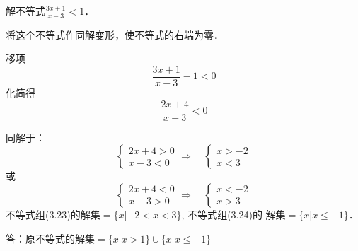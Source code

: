 \begin{example}
    解不等式$\frac{3x+1}{x-3}<1$．
\end{example}

\begin{solution}
    将这个不等式作同解变形，使不等式的右端为零．

    移项$$\frac{3x+1}{x-3}-1<0$$
化简得$$\frac{2x+4}{x-3}<0$$

同解于：
\begin{equation}
    \begin{cases}
        2x+4>0\\x-3<0
    \end{cases}\Rightarrow\quad \begin{cases}
        x>-2\\  x<3
    \end{cases}
\end{equation}
或
\begin{equation}
    \begin{cases}
        2x+4<0\\x-3>0
    \end{cases}\Rightarrow\quad \begin{cases}
        x<-2\\  x>3
    \end{cases}
\end{equation}
不等式组(3.23)的解集$=\{x|-2<x<3\}$, 不等式组(3.24)的
解集$=\{x|x\le -1\}$．

答：原不等式的解集$=\{x|x>1\}\cup \{x|x\le -1\}$

\end{solution}

